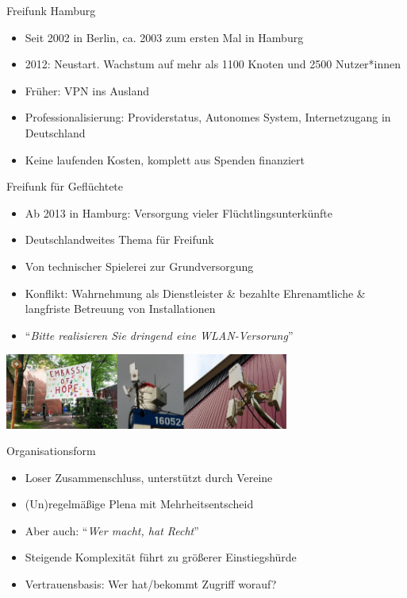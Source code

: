 \documentclass[t,aspectratio=169]{beamer}
\begin{document}
	\begin{frame}{Freifunk Hamburg}
    \begin{itemize}
      \item Seit 2002 in Berlin, ca. 2003 zum ersten Mal in Hamburg
      \item 2012: Neustart. Wachstum auf mehr als 1100 Knoten und 2500 Nutzer*innen
      \item Früher: VPN ins Ausland
			\item Professionalisierung: Providerstatus, Autonomes System, Internetzugang in Deutschland 
			\item Keine laufenden Kosten, komplett aus Spenden finanziert
    \end{itemize}
  \end{frame}
	
	\begin{frame}{Freifunk für Geflüchtete}
    \begin{itemize}
      \item Ab 2013 in Hamburg: Versorgung vieler Flüchtlingsunterkünfte
      \item Deutschlandweites Thema für Freifunk
      \item Von technischer Spielerei zur Grundversorgung
			\item Konflikt: Wahrnehmung als Dienstleister \& bezahlte Ehrenamtliche \& langfriste Betreuung von Installationen
			\item "`\textit{Bitte realisieren Sie dringend eine WLAN-Versorung}"'
    \end{itemize}
    \begin{center}
          \includegraphics[width=0.7\textwidth]{Bilder/gefluechtete}
    \end{center}

  \end{frame}
	
	\begin{frame}{Organisationsform}
    \begin{itemize}
      \item Loser Zusammenschluss, unterstützt durch Vereine
      \item (Un)regelmäßige Plena mit Mehrheitsentscheid
			\item Aber auch: "`\textit{Wer macht, hat Recht}"'
      \item Steigende Komplexität führt zu größerer Einstiegshürde
      \item Vertrauensbasis: Wer hat/bekommt Zugriff worauf?
    \end{itemize}
  \end{frame}
\end{document}
